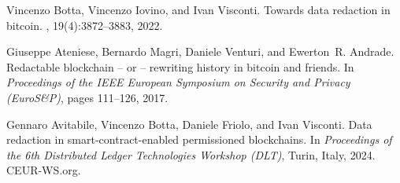 \begin{thebibliography}{3}

Vincenzo Botta, Vincenzo Iovino, and Ivan Visconti.
\newblock Towards data redaction in bitcoin.
,
  19(4):3872--3883, 2022.

Giuseppe Ateniese, Bernardo Magri, Daniele Venturi, and Ewerton~R. Andrade.
\newblock Redactable blockchain -- or -- rewriting history in bitcoin and
  friends.
\newblock In {\em Proceedings of the IEEE European Symposium on Security and
  Privacy (EuroS\&P)}, pages 111--126, 2017.

Gennaro Avitabile, Vincenzo Botta, Daniele Friolo, and Ivan Visconti.
\newblock Data redaction in smart-contract-enabled permissioned blockchains.
\newblock In {\em Proceedings of the 6th Distributed Ledger Technologies
  Workshop (DLT)}, Turin, Italy, 2024. CEUR-WS.org.

\end{thebibliography}
